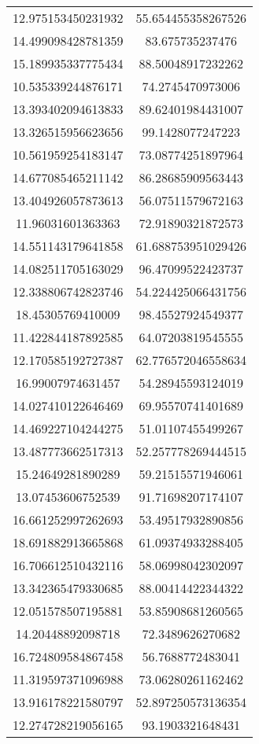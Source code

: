 \begin{table}
\begin{tabular}{cc}
12.975153450231932 & 55.654455358267526 \\
14.499098428781359 & 83.675735237476 \\
15.189935337775434 & 88.50048917232262 \\
10.535339244876171 & 74.2745470973006 \\
13.393402094613833 & 89.62401984431007 \\
13.326515956623656 & 99.1428077247223 \\
10.561959254183147 & 73.08774251897964 \\
14.677085465211142 & 86.28685909563443 \\
13.404926057873613 & 56.07511579672163 \\
11.96031601363363 & 72.91890321872573 \\
14.551143179641858 & 61.688753951029426 \\
14.082511705163029 & 96.47099522423737 \\
12.338806742823746 & 54.224425066431756 \\
18.45305769410009 & 98.45527924549377 \\
11.422844187892585 & 64.07203819545555 \\
12.170585192727387 & 62.776572046558634 \\
16.99007974631457 & 54.28945593124019 \\
14.027410122646469 & 69.95570741401689 \\
14.469227104244275 & 51.01107455499267 \\
13.487773662517313 & 52.257778269444515 \\
15.24649281890289 & 59.21515571946061 \\
13.07453606752539 & 91.71698207174107 \\
16.661252997262693 & 53.49517932890856 \\
18.691882913665868 & 61.09374933288405 \\
16.706612510432116 & 58.06998042302097 \\
13.342365479330685 & 88.00414422344322 \\
12.051578507195881 & 53.85908681260565 \\
14.20448892098718 & 72.3489626270682 \\
16.724809584867458 & 56.7688772483041 \\
11.319597371096988 & 73.06280261162462 \\
13.916178221580797 & 52.897250573136354 \\
12.274728219056165 & 93.1903321648431 \\

\end{tabular}
\end{table}
